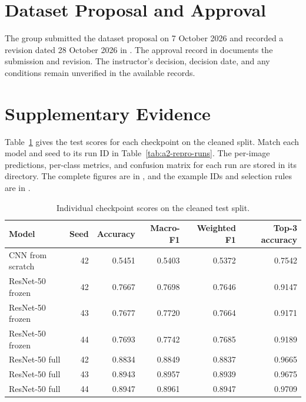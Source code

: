 \section{Dataset Proposal and Approval}
\label{app:dataset-proposal}

The group submitted the dataset proposal on 7 October 2026 and recorded a revision dated 28 October 2026 in . The approval record in  documents the submission and revision. The instructor's decision, decision date, and any conditions remain unverified in the available records.

\section{Supplementary Evidence}
\label{app:a2-supplementary-evidence}

Table~\ref{tab:a2-test-per-run} gives the test scores for each checkpoint on the cleaned split. Match each model and seed to its run ID in Table~\ref{tab:a2-repro-runs}. The per-image predictions, per-class metrics, and confusion matrix for each run are stored in its  directory. The complete figures are in , and the example IDs and selection rules are in .

\begin{table}[H]
  \centering
  \small
  \caption{Individual checkpoint scores on the cleaned test split.}
  \label{tab:a2-test-per-run}
  \begin{tabular}{@{}lrrrrr@{}}
    \toprule
    Model & Seed & Accuracy & Macro-F1 & Weighted F1 & Top-3 accuracy \\
    \midrule
    CNN from scratch & 42 & 0.5451 & 0.5403 & 0.5372 & 0.7542 \\
    ResNet-50 frozen & 42 & 0.7667 & 0.7698 & 0.7646 & 0.9147 \\
    ResNet-50 frozen & 43 & 0.7677 & 0.7720 & 0.7664 & 0.9171 \\
    ResNet-50 frozen & 44 & 0.7693 & 0.7742 & 0.7685 & 0.9189 \\
    ResNet-50 full   & 42 & 0.8834 & 0.8849 & 0.8837 & 0.9665 \\
    ResNet-50 full   & 43 & 0.8943 & 0.8957 & 0.8939 & 0.9675 \\
    ResNet-50 full   & 44 & 0.8947 & 0.8961 & 0.8947 & 0.9709 \\
    \bottomrule
  \end{tabular}
\end{table}

